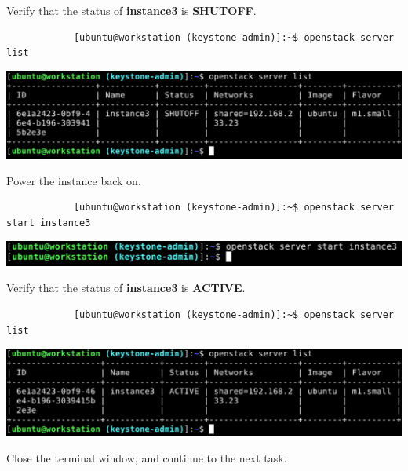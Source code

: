 \documentclass[letterpaper, 12pt]{article}
\begin{document}
\begin{enumerate}
    \begin{labstep}
        Verify that the status of \textbf{instance3} is \textbf{SHUTOFF}.
        \begin{lstlisting}
            [ubuntu@workstation (keystone-admin)]:~$ openstack server list
        \end{lstlisting}

        \begin{center}
            \includegraphics[width=\linewidth]{images/part4/step18.png}
        \end{center}
    \end{labstep}

    \begin{labstep}
        Power the instance back on.
        \begin{lstlisting}
            [ubuntu@workstation (keystone-admin)]:~$ openstack server start instance3
        \end{lstlisting}

        \begin{center}
            \includegraphics[width=\linewidth]{images/part4/step19.png}
        \end{center}
    \end{labstep}

    \begin{labstep}
        Verify that the status of \textbf{instance3} is \textbf{ACTIVE}.
        \begin{lstlisting}
            [ubuntu@workstation (keystone-admin)]:~$ openstack server list
        \end{lstlisting}

        \begin{center}
            \includegraphics[width=\linewidth]{images/part4/step20.png}
        \end{center}
    \end{labstep}

    \begin{labstep}
        Close the terminal window, and continue to the next task.
    \end{labstep}

\end{enumerate}
\end{document}
